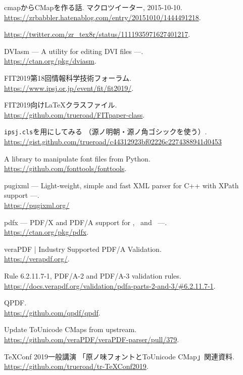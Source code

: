 \begin{thebibliography}{99}
 cmapからCMapを作る話.
  マクロツイーター, 2015-10-10. \\
  \url{https://zrbabbler.hatenablog.com/entry/20151010/1444491218}.

  \url{https://twitter.com/zr_tex8r/status/1111935971627401217}.

 DVIasm --- A utility for editing DVI files ---. \\
  \url{https://ctan.org/pkg/dviasm}.

 FIT2019第18回情報科学技術フォーラム. \\
  \url{https://www.ipsj.or.jp/event/fit/fit2019/}.

 FIT2019向け\LaTeX クラスファイル. \\
  \url{https://github.com/trueroad/FITpaper-class}.

 \texttt{ipsj.cls}を\upLaTeX 用にしてみる
  （源ノ明朝・源ノ角ゴシックを使う）. \\
  \url{https://gist.github.com/trueroad/c44312923bf02226c2274388941d0453}

 A library to manipulate font files from Python. \\
  \url{https://github.com/fonttools/fonttools}.

 pugixml --- Light-weight, simple and fast XML parser
  for C++ with XPath support ---. \\
  \url{https://pugixml.org/}

 pdfx --- PDF/X and PDF/A support for \pdfTeX ,
  \LuaTeX \ and \XeTeX \ ---. \\
  \url{https://ctan.org/pkg/pdfx}.

 veraPDF | Industry Supported PDF/A Validation. \\
  \url{https://verapdf.org/}.

 Rule 6.2.11.7-1,
  PDF/A-2 and PDF/A-3 validation rules. \\
  \url{https://docs.verapdf.org/validation/pdfa-parts-2-and-3/#6.2.11.7-1}.

  QPDF. \\
  \url{https://github.com/qpdf/qpdf}.

 Update ToUnicode CMaps from upstream. \\
  \url{https://github.com/veraPDF/veraPDF-parser/pull/379}.

 TeXConf 2019一般講演
  「原ノ味フォントとToUnicode CMap」関連資料. \\
  \url{https://github.com/trueroad/tr-TeXConf2019}.

\end{thebibliography}


